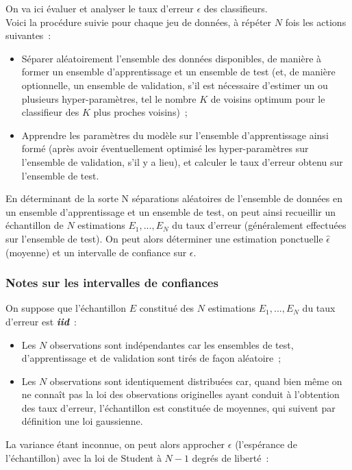 \documentclass[a4paper,10pt]{report}
\begin{document}
On va ici évaluer et analyser le taux d'erreur $\epsilon$ des classifieurs.\\

Voici la procédure suivie pour chaque jeu de données, à répéter $N$ fois les actions suivantes~:
\begin{itemize}
	\item Séparer aléatoirement l’ensemble des données disponibles, de manière à former un ensemble d’apprentissage et un ensemble de test (et, de manière optionnelle, un ensemble de validation, s’il est nécessaire d’estimer un ou plusieurs hyper-paramètres, tel le nombre $K$ de voisins optimum pour le classifieur des $K$ plus proches voisins)~;
	\item Apprendre les paramètres du modèle sur l’ensemble d’apprentissage ainsi formé (après avoir éventuellement optimisé les hyper-paramètres sur l’ensemble de validation, s’il y a lieu), et calculer le taux d’erreur obtenu sur l’ensemble de test.
\end{itemize}

En déterminant de la sorte N séparations aléatoires de l’ensemble de données en un ensemble d’apprentissage et un ensemble de test, on peut ainsi recueillir un échantillon de $N$ estimations $E_{1},...,E_{N}$ du taux d’erreur (généralement effectuées sur l’ensemble de test). On peut alors déterminer une estimation ponctuelle $\hat{\epsilon} $ (moyenne) et un intervalle de confiance sur $\epsilon$.


\subsubsection{Notes sur les intervalles de confiances}
On suppose que l'échantillon $E$ constitué des $N$ estimations $E_{1},...,E_{N}$ du taux d’erreur est  \textit{\textbf{iid}}~:
\begin{itemize}
	\item Les $N$ observations sont indépendantes car les ensembles de test, d'apprentissage et de validation sont tirés de façon aléatoire~;
	\item Les $N$ observations sont identiquement distribuées car, quand bien même on ne connaît pas la loi des observations originelles ayant conduit à l'obtention des taux d'erreur, l'échantillon est constituée de moyennes, qui suivent par définition une loi gaussienne.
\end{itemize}

La variance étant inconnue, on peut alors approcher $\epsilon$ (l'espérance de l'échantillon) avec la loi de Student à $N-1$ degrés de liberté~:
\end{document}
